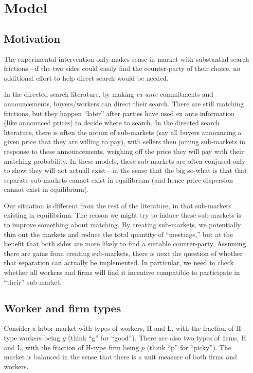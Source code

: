 \documentclass[12pt]{article}
\begin{document}
\section{Model}

\subsection{Motivation}
The experimental intervention only makes sense in market with substantial search frictions---if the two sides could easily find the counter-party of their choice, no additional effort to help direct search would be needed.

In the directed search literature, by making \emph{ex ante} commitments and announcements, buyers/workers can direct their search.
There are still matching frictions, but they happen ``later'' after parties have used ex ante information (like announced prices) to decide where to search.
In the directed search literature, there is often the notion of sub-markets (say all buyers announcing a given price that they are willing to pay), with sellers then joining sub-markets in response to these announcements, weighing off the price they will pay with their matching probability.
In these models, these sub-markets are often conjured only to show they will not actuall exist---in the sense that the big so-what is that that separate sub-markets cannot exist in equilibrium (and hence price dispersion cannot exist in equilibrium). 

Our situation is different from the rest of the literature, in that sub-markets existing in equilibrium.  
The reason we might try to induce these sub-markets is to improve something about matching. 
By creating sub-markets, we potentially thin out the markets and reduce the total quantity of ``meetings,'' but at the benefit that both sides are more likely to find a suitable counter-party.
Assuming there are gains from creating sub-markets, there is next the question of whether that separation can actually be implemented.
In particular, we need to check whether all workers and firms will find it incentive compatible to participate in ``their'' sub-market. 

\subsection{Worker and firm types}
Consider a labor market with types of workers, H and L, with the fraction of H-type workers being $g$ (think ``g'' for ``good'').
There are also two types of firms, H and L, with the fraction of H-type firm being $p$ (think ``p'' for ``picky'').
The market is balanced in the sense that there is a unit measure of both firms and workers. 
\end{document}
